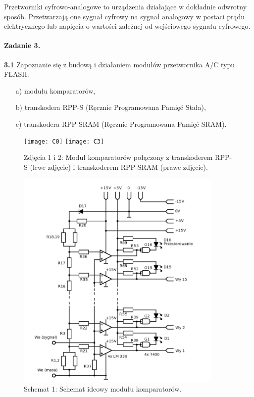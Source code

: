 \documentclass[14pt, table]{extarticle}
\begin{document}
Przetworniki cyfrowo-analogowe to urządzenia działające w dokładnie odwrotny sposób. Przetwarzają one sygnał cyfrowy na sygnał analogowy w postaci prądu elektrycznego lub napięcia o wartości zależnej od wejściowego sygnału cyfrowego.

\paragraph{Zadanie 3. \\}

\textbf{3.1} Zapoznanie się z budową i działaniem modułów przetwornika A/C typu FLASH: 
\begin{itemize}
	\item[a)] modułu komparatorów, 
	\item[b)] transkodera RPP-S (Ręcznie Programowana Pamięć Stała),
	\item[c)] transkodera RPP-SRAM (Ręcznie Programowana Pamięć SRAM).
\end{itemize}

\begin{figure}[H]
\texttt{[image: C0]}
\texttt{[image: C3]}
\centering
\captionsetup{labelformat=empty}
\caption{Zdjęcia 1 i 2: Moduł komparatorów połączony z transkoderem RPP-S (lewe zdjęcie) i transkoderem RPP-SRAM (prawe zdjęcie).}
\end{figure}

\begin{figure}[H]
\includegraphics[width=10cm]{D0}
\centering
\captionsetup{labelformat=empty}
\caption{Schemat 1: Schemat ideowy modułu komparatorów.}
\end{figure}
\end{document}
